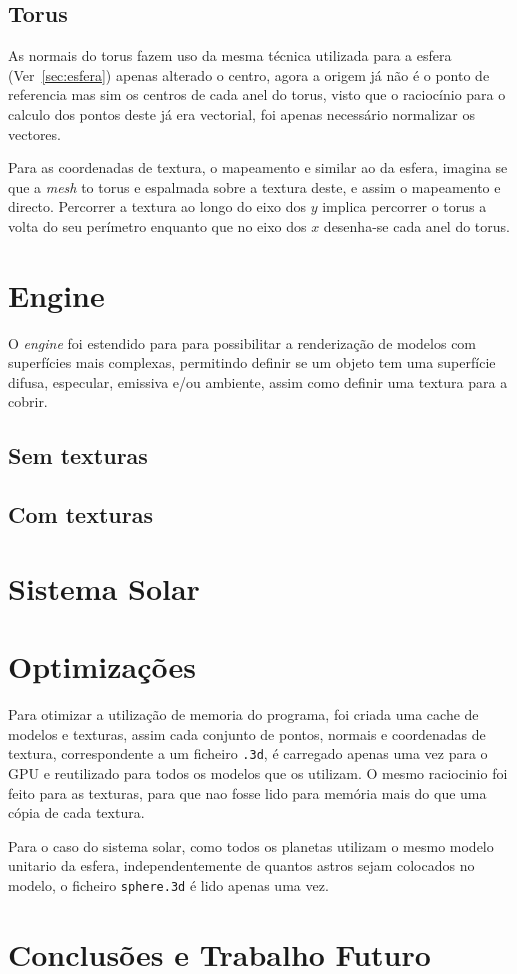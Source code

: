 \documentclass[a4paper]{article}
\begin{document}

\subsection{Torus}
As normais do torus fazem uso da mesma técnica utilizada para a esfera
(Ver~\ref{sec:esfera}) apenas alterado o centro, agora a origem já não é o
ponto de referencia mas sim os centros de cada anel do torus, visto que o
raciocínio para o calculo dos pontos deste já era vectorial, foi apenas
necessário normalizar os vectores.

Para as coordenadas de textura, o mapeamento e similar ao da esfera, imagina se
que a \textit{mesh} to torus e espalmada sobre a textura deste, e assim o
mapeamento e directo. Percorrer a textura ao longo do eixo dos $y$ implica
percorrer o torus a volta do seu perímetro enquanto que no eixo dos $x$
desenha-se cada anel do torus.


\section{Engine}

O \textit{engine} foi estendido para para possibilitar a renderização de
modelos com superfícies mais complexas, permitindo definir se um objeto tem uma
superfície difusa, especular, emissiva e/ou ambiente, assim como definir uma
textura para a cobrir.

\subsection{Sem texturas}

\subsection{Com texturas}

\section{Sistema Solar}

\section{Optimizações}
Para otimizar a utilização de memoria do programa, foi criada uma cache de
modelos e texturas, assim cada conjunto de pontos, normais e coordenadas de
textura, correspondente a um ficheiro \texttt{.3d}, é carregado apenas uma vez
para o GPU e reutilizado para todos os modelos que os utilizam. O mesmo
raciocinio foi feito para as texturas, para que nao fosse lido para memória
mais do que uma cópia de cada textura.

Para o caso do sistema solar, como todos os planetas utilizam o mesmo modelo
unitario da esfera, independentemente de quantos astros sejam colocados no
modelo, o ficheiro \texttt{sphere.3d} é lido apenas uma vez.

\section{Conclusões e Trabalho Futuro}
\end{document}
